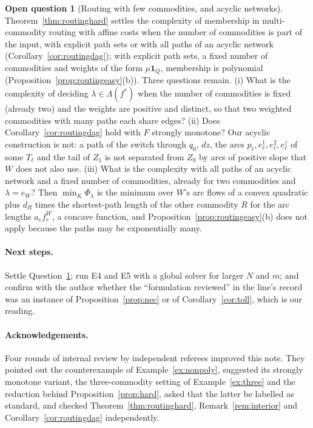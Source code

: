 \documentclass[11pt,a4paper]{article}
\theoremstyle{plain}
\theoremstyle{definition}
\newtheorem{question}[theorem]{Open question}
\theoremstyle{remark}
\newcommand{\Lam}{\Lambda}
\begin{document}
\begin{question}[Routing with few commodities, and acyclic networks]\label{q:multi}
Theorem~\ref{thm:routinghard} settles the complexity of membership in multi-commodity routing with affine costs when the number of commodities is part of the input, with explicit path sets or with all paths of an acyclic network (Corollary~\ref{cor:routingdag}); with explicit path sets, a fixed number of commodities and weights of the form $\mu\mathbf 1_Q$, membership is polynomial (Proposition~\ref{prop:routingeasy}(b)). Three questions remain. (i) What is the complexity of deciding $\lambda\in\Lam(f^*)$ when the number of commodities is fixed (already two) and the weights are positive and distinct, so that two weighted commodities with many paths each share edges? (ii) Does Corollary~\ref{cor:routingdag} hold with $F$ strongly monotone? Our acyclic construction is not: a path of the switch through $q_0$, $dz$, the arcs $p_\ell,e^1_\ell,e^2_\ell,e^z_\ell$ of some $T_\ell$ and the tail of $Z_1$ is not separated from $Z_0$ by arcs of positive slope that $W$ does not also use. (iii) What is the complexity with all paths of an acyclic network and a fixed number of commodities, already for two commodities and $\lambda=e_W$? Then $\min_K\Phi_\lambda$ is the minimum over $W$'s arc flows of a convex quadratic plus $d_R$ times the shortest-path length of the other commodity $R$ for the arc lengths $a_ef^W_e$, a concave function, and Proposition~\ref{prop:routingeasy}(b) does not apply because the paths may be exponentially many.
\end{question}

\paragraph{Next steps.} Settle Question~\ref{q:multi}; run E4 and E5 with a global solver for larger $N$ and $m$; and confirm with the author whether the ``formulation reviewed'' in the line's record was an instance of Proposition~\ref{prop:nec} or of Corollary~\ref{cor:toll}, which is our reading.

\paragraph{Acknowledgements.} Four rounds of internal review by independent referees improved this note. They pointed out the counterexample of Example~\ref{ex:nonpoly}, suggested its strongly monotone variant, the three-commodity setting of Example~\ref{ex:three} and the reduction behind Proposition~\ref{prop:hard}, asked that the latter be labelled as standard, and checked Theorem~\ref{thm:routinghard}, Remark~\ref{rem:interior} and Corollary~\ref{cor:routingdag} independently.
\end{document}
